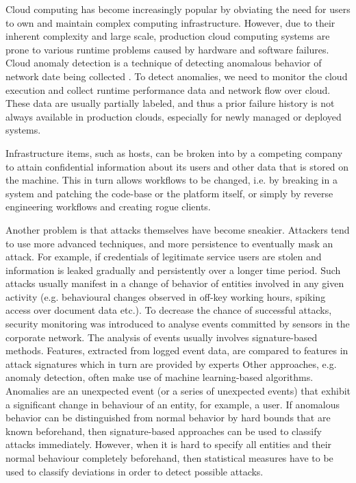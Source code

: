 \documentclass[a4paper, 12pt]{article}
\begin{document}
\par
Cloud computing has become increasingly popular by obviating the need for users to own and maintain complex computing infrastructure. However, due to their inherent complexity and large scale, production cloud computing systems are prone to various runtime problems caused by hardware and software failures. Cloud anomaly detection is a technique of detecting anomalous behavior of network date being collected . To detect anomalies, we need to monitor the cloud execution and collect runtime performance data and network flow over cloud. These data are usually partially labeled, and thus a prior failure history is not always available in production clouds, especially for newly managed or deployed systems.
\\

\par Infrastructure items, such as hosts, can be broken into by a competing company to attain confidential information about its users and other data that is stored on the machine. This in turn allows workflows to be changed, i.e. by breaking in a system and patching the code-base or the platform itself, or simply by reverse engineering workflows and creating rogue clients.
\\

\par 
Another problem is that attacks themselves have become sneakier. Attackers tend to use more advanced techniques, and more persistence to eventually mask an attack. For example, if credentials of legitimate service users are stolen and information is leaked gradually and persistently over a longer time period. Such attacks usually manifest in a change of behavior of entities involved in any given activity (e.g. behavioural changes observed in off-key working hours, spiking access over document data etc.). To decrease the chance of successful attacks, security monitoring was introduced to analyse events committed by sensors in the corporate network. The analysis of events usually involves signature-based methods. Features, extracted from logged event data, are compared to features in attack signatures which in turn are provided by experts Other approaches, e.g. anomaly detection, often make use of machine learning-based algorithms. Anomalies are an unexpected event (or a series of unexpected events) that exhibit a significant change in behaviour of an entity, for example, a user. If anomalous behavior can be distinguished from normal behavior by hard bounds that are known beforehand, then signature-based approaches can be used to classify attacks immediately. However, when it is hard to specify all entities and their normal behaviour completely beforehand, then statistical measures have to be used to classify deviations in order to detect possible attacks.
\\
\end{document}
